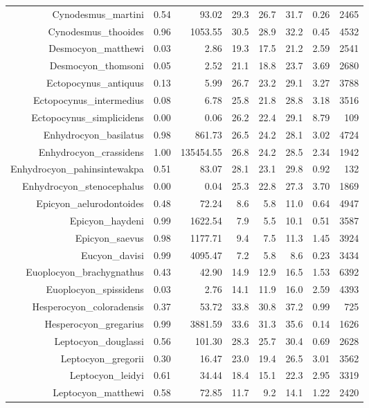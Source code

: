 \begin{table}[ht]
\begin{tabular}{rrrrrrrr}
  Cynodesmus\_martini & 0.54 & 93.02 & 29.3 & 26.7 & 31.7 & 0.26 & 2465 \\ 
  Cynodesmus\_thooides & 0.96 & 1053.55 & 30.5 & 28.9 & 32.2 & 0.45 & 4532 \\ 
  Desmocyon\_matthewi & 0.03 & 2.86 & 19.3 & 17.5 & 21.2 & 2.59 & 2541 \\ 
  Desmocyon\_thomsoni & 0.05 & 2.52 & 21.1 & 18.8 & 23.7 & 3.69 & 2680 \\ 
  Ectopocynus\_antiquus & 0.13 & 5.99 & 26.7 & 23.2 & 29.1 & 3.27 & 3788 \\ 
  Ectopocynus\_intermedius & 0.08 & 6.78 & 25.8 & 21.8 & 28.8 & 3.18 & 3516 \\ 
  Ectopocynus\_simplicidens & 0.00 & 0.06 & 26.2 & 22.4 & 29.1 & 8.79 & 109 \\ 
  Enhydrocyon\_basilatus & 0.98 & 861.73 & 26.5 & 24.2 & 28.1 & 3.02 & 4724 \\ 
  Enhydrocyon\_crassidens & 1.00 & 135454.55 & 26.8 & 24.2 & 28.5 & 2.34 & 1942 \\ 
  Enhydrocyon\_pahinsintewakpa & 0.51 & 83.07 & 28.1 & 23.1 & 29.8 & 0.92 & 132 \\ 
  Enhydrocyon\_stenocephalus & 0.00 & 0.04 & 25.3 & 22.8 & 27.3 & 3.70 & 1869 \\ 
  Epicyon\_aelurodontoides & 0.48 & 72.24 & 8.6 & 5.8 & 11.0 & 0.64 & 4947 \\ 
  Epicyon\_haydeni & 0.99 & 1622.54 & 7.9 & 5.5 & 10.1 & 0.51 & 3587 \\ 
  Epicyon\_saevus & 0.98 & 1177.71 & 9.4 & 7.5 & 11.3 & 1.45 & 3924 \\ 
  Eucyon\_davisi & 0.99 & 4095.47 & 7.2 & 5.8 & 8.6 & 0.23 & 3434 \\ 
  Euoplocyon\_brachygnathus & 0.43 & 42.90 & 14.9 & 12.9 & 16.5 & 1.53 & 6392 \\ 
  Euoplocyon\_spissidens & 0.03 & 2.76 & 14.1 & 11.9 & 16.0 & 2.59 & 4393 \\ 
  Hesperocyon\_coloradensis & 0.37 & 53.72 & 33.8 & 30.8 & 37.2 & 0.99 & 725 \\ 
  Hesperocyon\_gregarius & 0.99 & 3881.59 & 33.6 & 31.3 & 35.6 & 0.14 & 1626 \\ 
  Leptocyon\_douglassi & 0.56 & 101.30 & 28.3 & 25.7 & 30.4 & 0.69 & 2628 \\ 
  Leptocyon\_gregorii & 0.30 & 16.47 & 23.0 & 19.4 & 26.5 & 3.01 & 3562 \\ 
  Leptocyon\_leidyi & 0.61 & 34.44 & 18.4 & 15.1 & 22.3 & 2.95 & 3319 \\ 
  Leptocyon\_matthewi & 0.58 & 72.85 & 11.7 & 9.2 & 14.1 & 1.22 & 2420 \\ 

\end{tabular}
\end{table}

